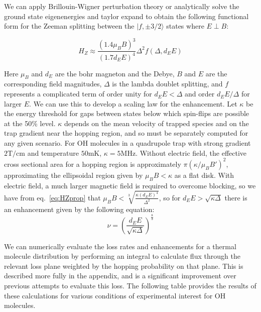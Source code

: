 \documentclass[%
 reprint,
 amsmath,amssymb,
 aps,
prl,
]{revtex4-1}
\begin{document}
We can apply Brillouin-Wigner perturbation theory or analytically solve the ground state eigenenergies and taylor expand to obtain the following functional form for the Zeeman splitting between the $|f,\pm3/2\rangle$ states where $E\!\perp\! B$:

\begin{equation}
\label{eq:HZprop}
H_Z\approx \frac{(1.4\mu_BB)^3}{(1.7d_EE)^4}\Delta^2 f(\Delta,d_EE)
\end{equation}

\noindent Here $\mu_B$ and $d_E$ are the bohr magneton and the Debye, $B$ and $E$ are the corresponding field magnitudes, $\Delta$ is the lambda doublet splitting, and $f$ represents a complicated term of order unity for $d_EE < \Delta$ and order $d_EE/\Delta$ for larger $E$. We can use this to develop a scaling law for the enhancement. Let $\kappa$ be the energy threshold for gaps between states below which spin-flips are possible at the 50\% level. $\kappa$ depends on the mean velocity of trapped species and on the trap gradient near the hopping region, and so must be separately computed for any given scenario. For OH molecules in a  quadrupole trap \cite{sawyer2008} with strong gradient $2 \text{T/cm}$ and temperature $50 \text{mK}$, $\kappa=5\text{MHz}$. Without electric field, the effective cross sectional area for a hopping region is approximately $\pi (\kappa/\mu_BB\prime)^2$, approximating the ellipsoidal region given by $\mu_BB<\kappa$ as a flat disk. With electric field, a much larger magnetic field is required to overcome blocking, so we have from eq.~\ref{eq:HZprop} that $\mu_BB < \sqrt[3]{\frac{\kappa (d_EE)^4}{\Delta^2}}$, so for $d_EE>\sqrt{\kappa\Delta}$ there is an enhancement given by the following equation:
\begin{equation}
\nu = \left(\frac{d_EE}{\sqrt{\kappa\Delta}}\right)^\frac{8}{3}
\label{eq:blimit}
\end{equation} 

We can numerically evaluate the loss rates and enhancements for a thermal molecule distribution by performing an integral to calculate flux through the relevant loss plane weighted by the hopping probability on that plane. This is described more fully in the appendix, and is a significant improvement over previous attempts to evaluate this loss. The following table provides the results of these calculations for various conditions of experimental interest for OH molecules.

\newcommand{\shiftright}[2]{\makebox[#1][r]{\makebox[0pt][l]{#2}}}
\end{document}
